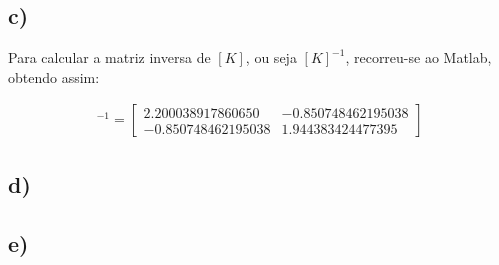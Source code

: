 \documentclass[portuguese, a4paper, titlepage]{article}
\begin{document}
	\subsection{c)}
	
		Para calcular a matriz inversa de $[K]$, ou seja $[K]^{-1}$, recorreu-se ao Matlab, obtendo assim:
		
		\begin{align*}	
			[K]^{-1} = 
			\begin{bmatrix}
				2.200038917860650  & -0.850748462195038 \\
  				-0.850748462195038  & 1.944383424477395
			\end{bmatrix}
		\end{align*}

	\subsection{d)}
	
	

	\subsection{e)}


\end{document}
